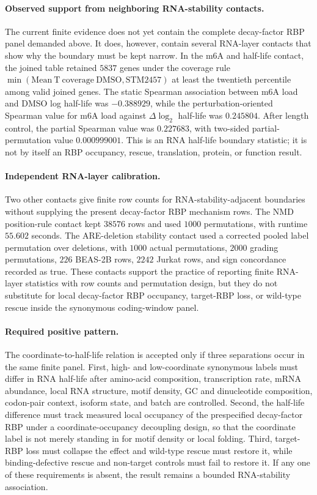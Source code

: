 \paragraph{Observed support from neighboring RNA-stability contacts.} The current finite evidence does not yet contain the complete decay-factor RBP panel demanded above. It does, however, contain several RNA-layer contacts that show why the boundary must be kept narrow. In the m6A and half-life contact, the joined table retained $5837$ genes under the coverage rule $\min(\mathrm{Mean\ T\ coverage\ DMSO},\mathrm{STM2457})$ at least the twentieth percentile among valid joined genes. The static Spearman association between m6A load and DMSO log half-life was $-0.388929$, while the perturbation-oriented Spearman value for m6A load against $\Delta\log_2$ half-life was $0.245804$. After length control, the partial Spearman value was $0.227683$, with two-sided partial-permutation value $0.000999001$. This is an RNA half-life boundary statistic; it is not by itself an RBP occupancy, rescue, translation, protein, or function result.

\paragraph{Independent RNA-layer calibration.} Two other contacts give finite row counts for RNA-stability-adjacent boundaries without supplying the present decay-factor RBP mechanism rows. The NMD position-rule contact kept $38576$ rows and used $1000$ permutations, with runtime $55.602$ seconds. The ARE-deletion stability contact used a corrected pooled label permutation over deletions, with $1000$ actual permutations, $2000$ grading permutations, $226$ BEAS-2B rows, $2242$ Jurkat rows, and sign concordance recorded as true. These contacts support the practice of reporting finite RNA-layer statistics with row counts and permutation design, but they do not substitute for local decay-factor RBP occupancy, target-RBP loss, or wild-type rescue inside the synonymous coding-window panel.

\paragraph{Required positive pattern.} The coordinate-to-half-life relation is accepted only if three separations occur in the same finite panel. First, high- and low-coordinate synonymous labels must differ in RNA half-life after amino-acid composition, transcription rate, mRNA abundance, local RNA structure, motif density, GC and dinucleotide composition, codon-pair context, isoform state, and batch are controlled. Second, the half-life difference must track measured local occupancy of the prespecified decay-factor RBP under a coordinate-occupancy decoupling design, so that the coordinate label is not merely standing in for motif density or local folding. Third, target-RBP loss must collapse the effect and wild-type rescue must restore it, while binding-defective rescue and non-target controls must fail to restore it. If any one of these requirements is absent, the result remains a bounded RNA-stability association.

